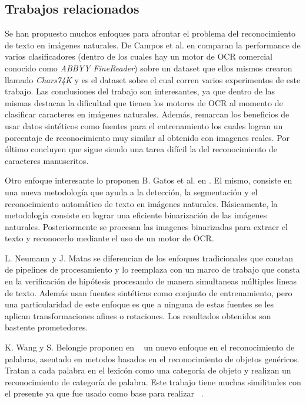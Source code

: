 \subsection{Trabajos relacionados}

	
	Se han propuesto muchos enfoques para afrontar el problema del reconocimiento de texto en imágenes naturales. De Campos et al. en \cite{dCBV09} comparan la performance de varios clasificadores (dentro de los cuales hay un motor de OCR comercial conocido como \textit{ABBYY FineReader}) sobre un dataset que ellos mismos crearon llamado \textit{Chars74K} y es el dataset sobre el cual corren varios experimentos de este trabajo. Las conclusiones del trabajo son interesantes, ya que dentro de las mismas destacan la dificultad que tienen los motores de OCR al momento de clasificar caracteres en imágenes naturales. Además, remarcan los beneficios de usar datos sintéticos como fuentes para el entrenamiento los cuales logran un porcentaje de reconocimiento muy similar al obtenido con imagenes reales. Por último concluyen que sigue siendo una tarea difícil la del reconocimiento de caracteres manuscritos.
	
	Otro enfoque interesante lo proponen B. Gatos et al. en \cite{GPP03}. El mismo, consiste en una nueva metodología que ayuda a la detección, la segmentación y el reconocimiento automático de texto en imágenes naturales. Básicamente, la metodología consiste en lograr una eficiente binarización de las imágenes naturales. Posteriormente se procesan las imagenes binarizadas para extraer el texto y reconocerlo mediante el uso de un motor de OCR.

	L. Neumann y J. Matas se diferencian de los enfoques tradicionales que constan de pipelines de procesamiento y lo reemplaza con un marco de trabajo que consta en la verificación de hipótesis procesando de manera simultaneas múltiples lineas de texto. Además usan fuentes sintéticas como conjunto de entrenamiento, pero una particularidad de este enfoque es que a ninguna de estas fuentes se les aplican transformaciones afines o rotaciones. Los resultados obtenidos son bastente prometedores.
	
		K. Wang y S. Belongie proponen en ~\cite{WangBelongie} un nuevo enfoque en el reconocimiento de palabras, asentado en metodos basados en el reconocimiento de objetos genéricos. Tratan a cada palabra en el lexicón como una categoría de objeto y realizan un reconocimiento de categoría de palabra. Este trabajo tiene muchas similitudes con el presente ya que fue usado como base para realizar ~\cite{wang}.
